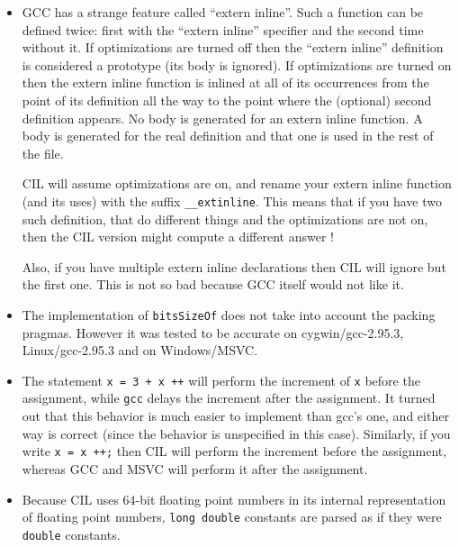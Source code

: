 \documentclass{article}
\def\t#1{{\tt #1}}
\begin{document}
\begin{itemize}
\item GCC has a strange feature called ``extern inline''. Such a function can
be defined twice: first with the ``extern inline'' specifier and the second
time without it. If optimizations are turned off then the ``extern inline''
definition is considered a prototype (its body is ignored). If optimizations
are turned on then the extern inline function is inlined at all of its
occurrences from the point of its definition all the way to the point where the
(optional) second definition appears. No body is generated for an extern
inline function. A body is generated for the real definition and that one is
used in the rest of the file. 

CIL will assume optimizations are on, and rename your extern inline
function (and its uses) with the suffix
\t{\_\_extinline}. This means that if you have two such definition, that do
different things and the optimizations are not on, then the CIL version might
compute a different answer !

Also, if you have multiple extern inline declarations then CIL will ignore
but the first one. This is not so bad because GCC itself would not like it. 

\item The implementation of \t{bitsSizeOf} does not take into account the
  packing pragmas. However it was tested to be accurate on cygwin/gcc-2.95.3,
  Linux/gcc-2.95.3 and on Windows/MSVC.

\item The statement \t{x = 3 + x ++} will perform the increment of \t{x}
  before the assignment, while \t{gcc} delays the increment after the
  assignment. It turned out that this behavior is much easier to implement
  than gcc's one, and either way is correct (since the behavior is unspecified
  in this case). Similarly, if you write \t{x = x ++;} then CIL will perform
  the increment before the assignment, whereas GCC and MSVC will perform it
  after the assignment. 

\item Because CIL uses 64-bit floating point numbers in its internal
  representation of floating point numbers, \t{long double} constants
  are parsed as if they were \t{double} constants.

\end{itemize}
\end{document}
